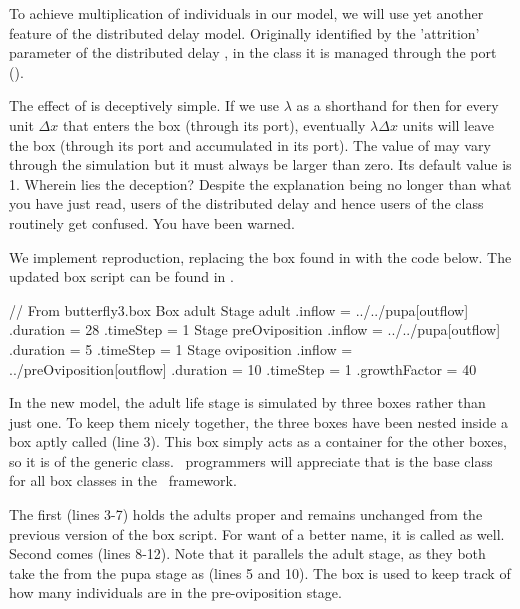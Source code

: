 To achieve multiplication of individuals in our model, we will use yet another feature of the distributed delay model. Originally identified by the 'attrition' parameter of the distributed delay \citep{Vansick77}, in the  class it is managed through the  port (). 

The effect of  is deceptively simple. If we use $\lambda$ as a shorthand for  then for every unit $\Delta x$ that enters the  box (through its  port), eventually $\lambda\Delta x$ units will leave the box (through its  port and accumulated in its  port). The value of  may vary through the simulation but it must always be larger than zero. Its default value is 1. Wherein lies the deception? Despite the explanation being no longer than what you have just read, users of the distributed delay and hence users of the  class routinely get confused. You have been warned.

We implement reproduction, replacing the  box found in  with the code below. The updated box script can be found in .

\lstset{numbers=left}
\begin{boxscript}
// From butterfly3.box
Box adult {
  Stage adult {
    .inflow = ../../pupa[outflow]
    .duration = 28
    .timeStep = 1
  }
  Stage preOviposition {
    .inflow = ../../pupa[outflow]
    .duration = 5
    .timeStep = 1
  }
  Stage oviposition {
    .inflow = ../preOviposition[outflow]
    .duration = 10
    .timeStep = 1
    .growthFactor = 40
  }
}
\end{boxscript}
\lstset{numbers=none}

In the new model, the adult life stage is simulated by three  boxes rather than just one. To keep them nicely together, the three  boxes have been nested inside a box aptly called  (line 3). This box simply acts as a container for the other boxes, so it is of the generic  class. \CPP\ programmers will appreciate that  is the base class for all box classes in the \US\ framework.

The first  (lines 3-7) holds the adults proper and remains unchanged from the previous version of the box script. For want of a better name, it is called  as well. Second comes  (lines 8-12). Note that it parallels the adult stage, as they both take the  from the pupa stage as  (lines 5 and 10). The  box is used to keep track of how many individuals are in the pre-oviposition stage.

